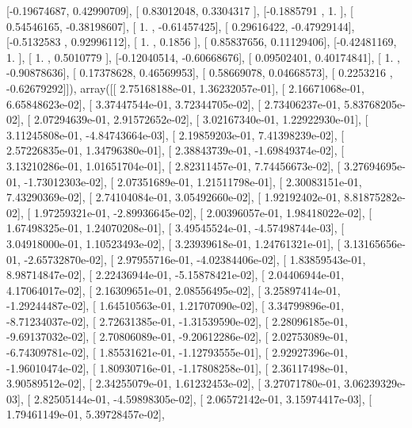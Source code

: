 \documentclass{article}
\begin{document}
       [-0.19674687,  0.42990709],
       [ 0.83012048,  0.3304317 ],
       [-0.1885791 ,  1.        ],
       [ 0.54546165, -0.38198607],
       [ 1.        , -0.61457425],
       [ 0.29616422, -0.47929144],
       [-0.5132583 ,  0.92996112],
       [ 1.        ,  0.1856    ],
       [ 0.85837656,  0.11129406],
       [-0.42481169,  1.        ],
       [ 1.        ,  0.5010779 ],
       [-0.12040514, -0.60668676],
       [ 0.09502401,  0.40174841],
       [ 1.        , -0.90878636],
       [ 0.17378628,  0.46569953],
       [ 0.58669078,  0.04668573],
       [ 0.2253216 , -0.62679292]]), array([[  2.75168188e-01,   1.36232057e-01],
       [  2.16671068e-01,   6.65848623e-02],
       [  3.37447544e-01,   3.72344705e-02],
       [  2.73406237e-01,   5.83768205e-02],
       [  2.07294639e-01,   2.91572652e-02],
       [  3.02167340e-01,   1.22922930e-01],
       [  3.11245808e-01,  -4.84743664e-03],
       [  2.19859203e-01,   7.41398239e-02],
       [  2.57226835e-01,   1.34796380e-01],
       [  2.38843739e-01,  -1.69849374e-02],
       [  3.13210286e-01,   1.01651704e-01],
       [  2.82311457e-01,   7.74456673e-02],
       [  3.27694695e-01,  -1.73012303e-02],
       [  2.07351689e-01,   1.21511798e-01],
       [  2.30083151e-01,   7.43290369e-02],
       [  2.74104084e-01,   3.05492660e-02],
       [  1.92192402e-01,   8.81875282e-02],
       [  1.97259321e-01,  -2.89936645e-02],
       [  2.00396057e-01,   1.98418022e-02],
       [  1.67498325e-01,   1.24070208e-01],
       [  3.49545524e-01,  -4.57498744e-03],
       [  3.04918000e-01,   1.10523493e-02],
       [  3.23939618e-01,   1.24761321e-01],
       [  3.13165656e-01,  -2.65732870e-02],
       [  2.97955716e-01,  -4.02384406e-02],
       [  1.83859543e-01,   8.98714847e-02],
       [  2.22436944e-01,  -5.15878421e-02],
       [  2.04406944e-01,   4.17064017e-02],
       [  2.16309651e-01,   2.08556495e-02],
       [  3.25897414e-01,  -1.29244487e-02],
       [  1.64510563e-01,   1.21707090e-02],
       [  3.34799896e-01,  -8.71234037e-02],
       [  2.72631385e-01,  -1.31539590e-02],
       [  2.28096185e-01,  -9.69137032e-02],
       [  2.70806089e-01,  -9.20612286e-02],
       [  2.02753089e-01,  -6.74309781e-02],
       [  1.85531621e-01,  -1.12793555e-01],
       [  2.92927396e-01,  -1.96010474e-02],
       [  1.80930716e-01,  -1.17808258e-01],
       [  2.36117498e-01,   3.90589512e-02],
       [  2.34255079e-01,   1.61232453e-02],
       [  3.27071780e-01,   3.06239329e-03],
       [  2.82505144e-01,  -4.59898305e-02],
       [  2.06572142e-01,   3.15974417e-03],
       [  1.79461149e-01,   5.39728457e-02],
\end{document}
